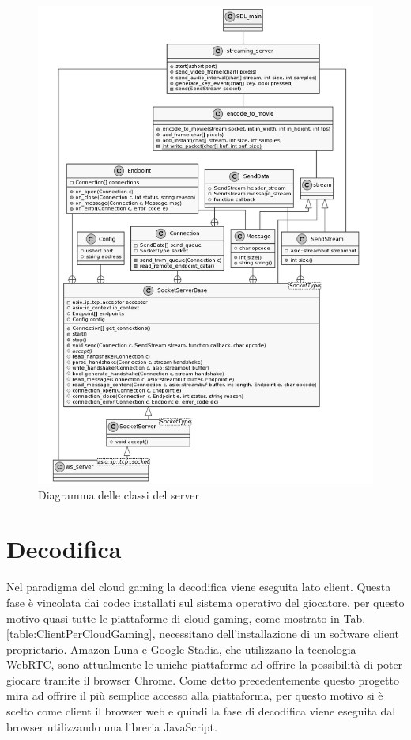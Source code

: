 \begin{figure}[H]
	\includegraphics[width=\linewidth]{immagini/class_server_and_encoding_full}
	\caption{Diagramma delle classi del server}
	\label{fig:class_server_and_encoding_full}
\end{figure}




\section{Decodifica}
Nel paradigma del cloud gaming la decodifica viene eseguita lato client. Questa fase è vincolata dai codec installati sul sistema operativo del giocatore, per questo motivo quasi tutte le piattaforme di cloud gaming, come mostrato in Tab. \ref{table:ClientPerCloudGaming}, necessitano dell'installazione di un software client proprietario. Amazon Luna e Google Stadia, che utilizzano la tecnologia WebRTC, sono attualmente le uniche piattaforme ad offrire la possibilità di poter giocare tramite il browser Chrome. Come detto precedentemente questo progetto mira ad offrire il più semplice accesso alla piattaforma, per questo motivo si è scelto come client il browser web e quindi la fase di decodifica viene eseguita dal browser utilizzando una libreria JavaScript.


